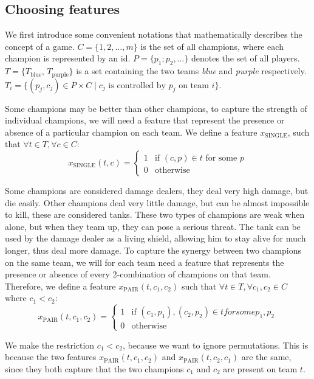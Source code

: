 \subsection{Choosing features}\label{sec:choosingfeatures}
We first introduce some convenient notations that mathematically describes the concept of a game.
$C = \{1, 2, \dots, m\}$ is the set of all champions, where each champion is represented by an id.
$P = \{p_1; p_2, \dots\}$ denotes the set of all players.
$T = \{T_\text{blue}$, $T_\text{purple}\}$ is a set containing the two teams \emph{blue} and \emph{purple} respectively.
$T_i = \{ (p_j, c_j) \in P \times C \mid c_j \text{ is controlled by } p_j \text{ on team } i \}$.

Some champions may be better than other champions, to capture the strength of individual champions, we will need a feature that represent the presence or absence of a particular champion on each team.
We define a feature $x_\text{SINGLE}$, such that $\forall t \in T, \forall c \in C:$
\[
x_\text{SINGLE}(t, c) = 
\begin{cases} 
  1 & \text{if } (c, p) \in t \text{ for some } p \\
  0 & \text{otherwise} 
\end{cases}
\]

Some champions are considered damage dealers, they deal very high damage, but die easily. Other champions deal very little damage, but can be almost impossible to kill, these are considered tanks. These two types of champions are weak when alone, but when they team up, they can pose a serious threat. The tank can be used by the damage dealer as a living shield, allowing him to stay alive for much longer, thus deal more damage.
To capture the synergy between two champions on the same team, we will for each team need a feature that represents the presence or absence of every 2-combination %
of champions on that team. Therefore, we define a feature $x_\text{PAIR}(t, c_1, c_2)$ such that $\forall t \in T, \forall c_1, c_2 \in C$ where $c_1 < c_2$:
\[
x_\text{PAIR}(t, c_1, c_2) = 
\begin{cases} 
  1 & \text{if } (c_1, p_1), (c_2, p_2) \in t for some p_1, p_2\\
  0 & \text{otherwise} 
\end{cases}
\]

We make the restriction $c_1 < c_2$, because we want to ignore permutations. This is because the two features $x_\text{PAIR}(t, c_1, c_2)$ and $x_\text{PAIR}(t, c_2, c_1)$ are the same, since they both capture that the two champions $c_1$ and $c_2$ are present on team $t$.

